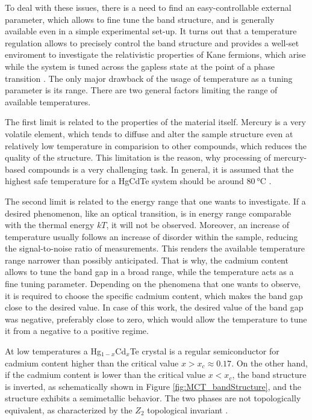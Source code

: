 \documentclass[titlepage,a4paper]{book}
\begin{document}
To deal with these issues, there is a need to find an easy-controllable external parameter, which allows to fine tune the band structure, and is generally available even in a simple experimental set-up. It turns out that a temperature regulation allows to precisely control the band structure and provides a well-set enviroment to investigate the relativistic properties of Kane fermions, which arise while the system is tuned across the gapless state at the point of a phase transition \cite{Teppe_MCT}. The only major drawback of the usage of temperature as a tuning parameter is its range. There are two general factors limiting the range of available temperatures. 

The first limit is related to the properties of the material itself. Mercury is a very volatile element, which tends to diffuse and alter the sample structure even at relatively low temperature in comparision to other compounds, which reduces the quality of the structure. This limitation is the reason, why processing of mercury-based compounds is a very challenging task. In general, it is assumed that the highest safe temperature for a HgCdTe system should be around $\SI{80}{\degreeCelsius}$ \cite{Daumer_MCT_temperature}.

The second limit is related to the energy range that one wants to investigate. If a desired phenomenon, like an optical transition, is in energy range comparable with the thermal energy $kT$, it will not be observed. Moreover, an increase of temperature usually follows an increase of disorder within the sample, reducing the signal-to-noise ratio of measurements. This renders the available temperature range narrower than possibly anticipated. That is why, the cadmium content allows to tune the band gap in a broad range, while the temperature acts as a fine tuning parameter. Depending on the phenomena that one wants to observe, it is required to choose the specific cadmium content, which makes the band gap close to the desired value. In case of this work, the desired value of the band gap was negative, preferably close to zero, which would allow the temperature to tune it from a negative to a positive regime. 

At low temperatures a Hg$_{1-x}$Cd$_x$Te crystal is a regular semiconductor for cadmium content higher than the critical value $x > x_c \approx 0.17$. On the other hand, if the cadmium content is lower than the critical value $x < x_c$, the band structure is inverted, as schematically shown in Figure \ref{fig:MCT_bandStructure}, and the structure exhibits a semimetallic behavior. The two phases are not topologically equivalent, as characterized by the $Z_2$ topological invariant \cite{Bernevig_Topology2}.
\end{document}
